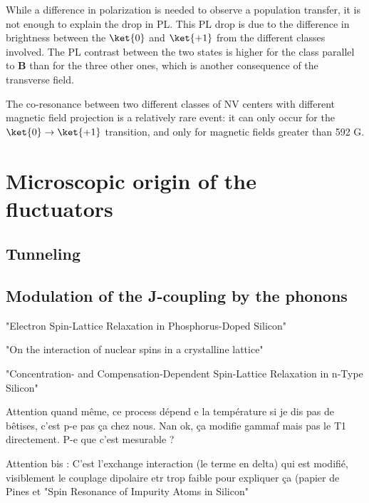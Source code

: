 \documentclass[a4paper,11pt]{report}
\begin{document}
While a difference in polarization is needed to observe a population transfer, it is not enough to explain the drop in PL. This PL drop is due to the difference in brightness between the $\ket{0}$ and $\ket{+1}$ from the different classes involved. The PL contrast between the two states is higher for the class parallel to $\mathbf{B}$ than for the three other ones, which is another consequence of the transverse field.

The co-resonance between two different classes of NV centers with different magnetic field projection is a relatively rare event: it can only occur for the $\ket{0} \to \ket{+1}$ transition, and only for magnetic fields greater than 592 G.


\section{Microscopic origin of the fluctuators}
\subsection{Tunneling}
\subsection{Modulation of the J-coupling by the phonons}
"Electron Spin-Lattice Relaxation in Phosphorus-Doped Silicon"

"On the interaction of nuclear spins in a crystalline lattice"

"Concentration- and Compensation-Dependent Spin-Lattice Relaxation in n-Type Silicon"


Attention quand même, ce process dépend e la température si je dis pas de bêtises, c'est p-e pas ça chez nous. Nan ok, ça modifie gammaf mais pas le T1 directement. P-e que c'est mesurable ?

Attention bis : C'est l'exchange interaction (le terme en delta) qui est modifié, visiblement le couplage dipolaire etr trop faible pour expliquer ça (papier de Pines et "Spin Resonance of Impurity Atoms in Silicon"
\printbibliography
\end{document}
